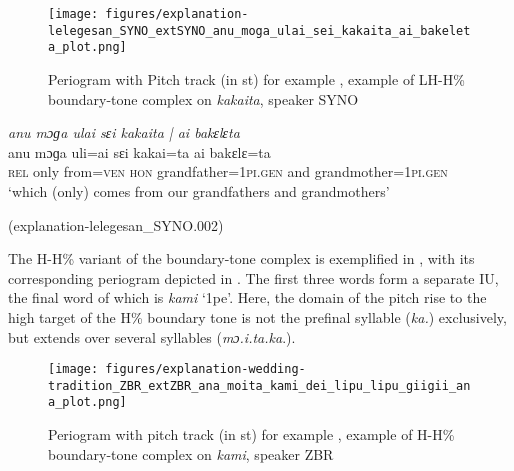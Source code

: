 \begin{figure}
	\texttt{[image: figures/explanation-lelegesan\_SYNO\_extSYNO\_anu\_moga\_ulai\_sei\_kakaita\_ai\_bakeleta\_plot.png]}
	\caption{Periogram with Pitch track (in st) for example , example of LH-H\% boundary-tone complex on  \textit{kakaita}, speaker SYNO}
	\label{pitch:anu moga ulai sei kakaita ai bakeleta}
\end{figure}

\newpage
\ea
\label{ex:anu moga ulai sei kakaita ai bakeleta}
\textit{anu mɔɡa ulai sɛi kakaita | ai bakɛlɛta} \\
\gll anu mɔɡa uli=ai sɛi kakai=ta ai bakɛlɛ=ta \\
\textsc{rel} only from=\textsc{ven} \textsc{hon} grandfather=1\textsc{pi}.\textsc{gen} and grandmother=1\textsc{pi}.\textsc{gen}\\ 
\glt ‘which (only) comes from our grandfathers and grandmothers’ \begin{flushright}(explanation-lelegesan\_SYNO.002)
	\end{flushright}
\z



The H-H\% variant of the boundary-tone complex is exemplified in   ,  with its corresponding periogram depicted in  . The first three words form a separate IU, the final word of which is \textit{kami} `1pe'. Here, the domain of the pitch rise to the high target of the H\% boundary tone is not the prefinal syllable (\textit{ka.})
exclusively, but extends over several syllables (\textit{mɔ.i.ta.ka}.).








\begin{figure}
	\texttt{[image: figures/explanation-wedding-tradition\_ZBR\_extZBR\_ana\_moita\_kami\_dei\_lipu\_lipu\_giigii\_ana\_plot.png]}
	\caption{Periogram with pitch track (in st) for example , example of H-H\% boundary-tone complex  on  \textit{kami}, speaker ZBR}
	\label{pitch:ana moita kami dɛi lipulipu giigii ana}
\end{figure}


